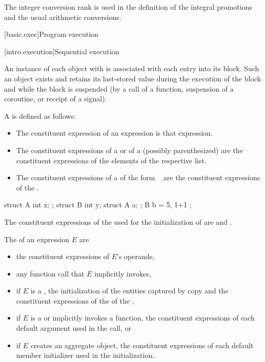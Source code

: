 \begin{note}
The integer conversion rank is used in the definition of the integral
promotions and the usual arithmetic
conversions.
\end{note}

[basic.exec]{Program execution}

[intro.execution]{Sequential execution}

\pnum
An instance of each object with  is associated with each entry into its
block. Such an object exists and retains its last-stored value during
the execution of the block and while the block is suspended (by a call
of a function, suspension of a coroutine, or receipt of a signal).

\pnum
A  is defined as follows:
\begin{itemize}
\item
The constituent expression of an expression is that expression.
\item
The constituent expressions of a  or
of a (possibly parenthesized) 
are the constituent expressions of the elements of the respective list.
\item
The constituent expressions of a 
of the form \tcode{=}~
are the constituent expressions of the .
\end{itemize}
\begin{example}
\begin{codeblock}
struct A { int x; };
struct B { int y; struct A a; };
B b = { 5, { 1+1 } };
\end{codeblock}
The constituent expressions of the 
used for the initialization of  are  and .
\end{example}

\pnum
The  of an expression $E$ are
\begin{itemize}
\item
the constituent expressions of $E$'s operands,
\item
any function call that $E$ implicitly invokes,
\item
if $E$ is a ,
the initialization of the entities captured by copy and
the constituent expressions of the  of the ,
\item
if $E$ is a  or implicitly invokes a function,
the constituent expressions of each default argument
used in the call, or
\item
if $E$ creates an aggregate object,
the constituent expressions of each default member initializer
used in the initialization.
\end{itemize}

